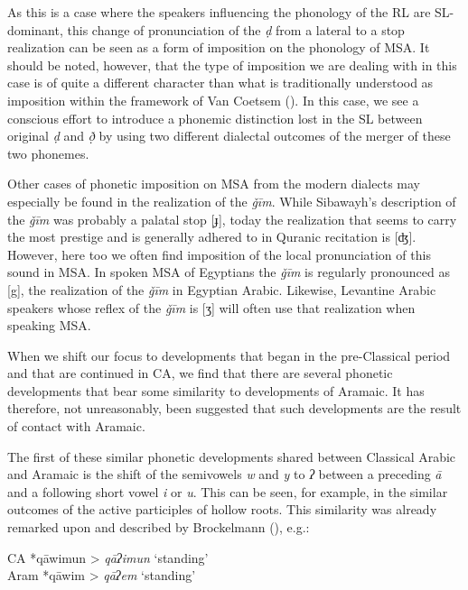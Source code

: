 \documentclass[output=paper]{langsci/langscibook}
\begin{document}
As this is a case where the speakers influencing the phonology of the RL are SL-dominant, this change of pronunciation of the \textit{ḍ} from a lateral to a stop realization can be seen as a form of imposition on the phonology of MSA. It should be noted, however, that the type of imposition we are dealing with in this case is of quite a different character than what is traditionally understood as imposition within the framework of Van Coetsem (\citeyear{VanCoetsem1988,VanCoetsem2000}). In this case, we see a conscious effort to introduce a phonemic distinction lost in the SL between original \textit{ḍ} and \textit{ð̣} by using two different dialectal outcomes of the merger of these two phonemes.

Other cases of phonetic imposition on MSA from the modern dialects may especially be found in the realization of the \textit{ǧīm}. While Sibawayh’s description of the \textit{ǧīm} was probably a palatal stop [ɟ], today the realization that seems to carry the most prestige and is generally adhered to in Quranic recitation is [ʤ]. However, here too we often find imposition of the local pronunciation of this sound in MSA. In spoken MSA of Egyptians the \textit{ǧīm} is regularly pronounced as [g], the realization of the \textit{ǧīm} in Egyptian Arabic. Likewise, Levantine Arabic speakers whose reflex of the \textit{ǧīm} is [ʒ] will often use that realization when speaking MSA.

When we shift our focus to developments that began in the pre-Classical period and that are continued in CA, we find that there are several phonetic developments that bear some similarity to developments of Aramaic. It has therefore, not unreasonably, been suggested that such developments are the result of contact with Aramaic.

The first of these similar phonetic developments shared between Classical Arabic and Aramaic is the shift of the semivowels  \textit{w} and \textit{y} to \textit{ʔ} between a preceding \textit{ā} and a following short vowel \textit{i} or \textit{u}. This can be seen, for example, in the similar outcomes of the active participles of hollow roots. This similarity was already remarked upon and described by Brockelmann (\citeyear[138--139]{Brockelmann1908}), e.g.:

\ea
\ea CA *qāwimun > \textit{qāʔimun} ‘standing’\\
\ex Aram *qāwim > \textit{qāʔem} ‘standing’
\z
\z
\end{document}
